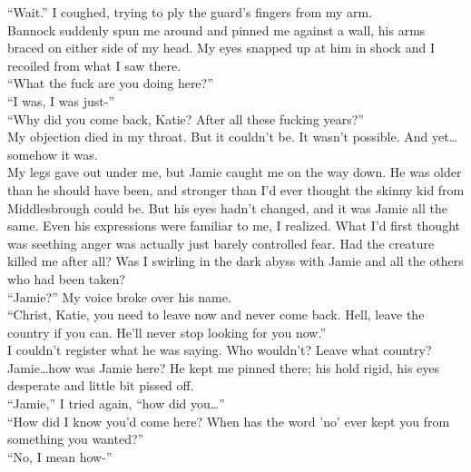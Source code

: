 \documentclass[a5paper]{scrartcl}
\begin{document}
\enquote{Wait.} I coughed, trying to ply the guard's fingers from my arm.\\


Bannock suddenly spun me around and pinned me against a wall, his arms braced on either side of my head. My eyes snapped up at him in shock and I recoiled from what I saw there.\\


\enquote{What the fuck are you doing here?}\\


\enquote{I was, I was just-}\\


\enquote{Why did you come back, Katie? After all these fucking years?}\\


My objection died in my throat. But it couldn't be. It wasn't possible. And yet\dots somehow it was.\\


My legs gave out under me, but Jamie caught me on the way down. He was older than he should have been, and stronger than I'd ever thought the skinny kid from Middlesbrough could be. But his eyes hadn't changed, and it was Jamie all the same. Even his expressions were familiar to me, I realized. What I'd first thought was seething anger was actually just barely controlled fear. Had the creature killed me after all? Was I swirling in the dark abyss with Jamie and all the others who had been taken?\\


\enquote{Jamie?} My voice broke over his name.\\


\enquote{Christ, Katie, you need to leave now and never come back. Hell, leave the country if you can. He'll never stop looking for you now.}\\


I couldn't register what he was saying. Who wouldn't? Leave what country? Jamie\dots how was Jamie here? He kept me pinned there; his hold rigid, his eyes desperate and little bit pissed off.\\


\enquote{Jamie,} I tried again, \enquote{how did you\dots }\\


\enquote{How did I know you'd come here? When has the word 'no' ever kept you from something you wanted?}\\


\enquote{No, I mean how-}\\
\end{document}

